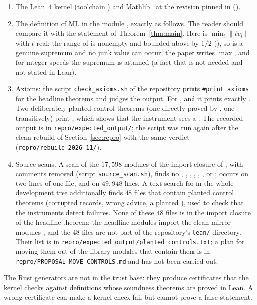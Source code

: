 \documentclass[11pt]{article}
\theoremstyle{remark}
\newcommand{\ML}{\mathrm{ML}}
\newcommand{\dist}[1]{\lVert #1\rVert}
\begin{document}
\begin{enumerate}
\item The Lean~4 kernel (toolchain ) and Mathlib~\cite{Mathlib} at the revision pinned in  ().
\item The definition of $\ML$ in the module , exactly as follows. The reader should compare it with the statement of Theorem~\ref{thm:main}.
Here  is $\min_i\dist{tv_i}$ with $t$ real; the range of  is nonempty and bounded above by $1/2$ (), so  is a genuine supremum and no junk value can occur; the paper writes $\max$, and for integer speeds the supremum is attained (a fact that is not needed and not stated in Lean).
\item Axioms: the script \texttt{check\_axioms.sh} of the repository prints \texttt{\#print axioms} for the headline theorems and judges the output. For ,  and  it prints exactly . Two deliberately planted control theorems (one directly proved by , one transitively) print , which shows that the instrument sees a . The recorded output is in \texttt{repro/expected\_output/}; the script was run again after the clean rebuild of Section~\ref{sec:repro} with the same verdict (\texttt{repro/rebuild\_2026\_11/}).
\item Source scans. A scan of the $17{,}598$ modules of the import closure of , with comments removed (script \texttt{source\_scan.sh}), finds no , , , , , ,  or ;  occurs on two lines of one file, and  on $49{,}948$ lines. A text search for  in the whole development tree additionally finds $48$ files that contain planted control theorems (corrupted records, wrong advice, a planted ), used to check that the instruments detect failures. None of these $48$ files is in the import closure of the headline theorem: the headline modules import the clean mirror modules , and the $48$ files are not part of the repository's \texttt{lean/} directory. Their list is in \texttt{repro/expected\_output/planted\_controls.txt}; a plan for moving them out of the library modules that contain them is in \texttt{repro/PROPOSAL\_MOVE\_CONTROLS.md} and has not been carried out.
\end{enumerate}
The Rust generators are not in the trust base: they produce certificates that the kernel checks against definitions whose soundness theorems are proved in Lean. A wrong certificate can make a kernel check fail but cannot prove a false statement.
\end{document}
